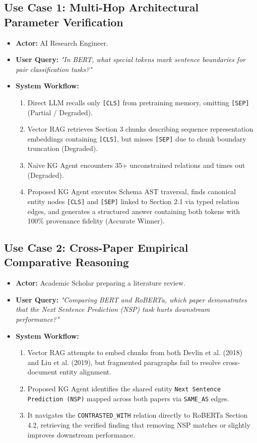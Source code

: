 \documentclass[12pt,a4paper,oneside]{report}
\begin{document}
\subsection{Use Case 1: Multi-Hop Architectural Parameter Verification}
\begin{itemize}
    \item \textbf{Actor:} AI Research Engineer.
    \item \textbf{User Query:} \textit{"In BERT, what special tokens mark sentence boundaries for pair classification tasks?"}
    \item \textbf{System Workflow:}
    \begin{enumerate}
        \item Direct LLM recalls only \texttt{[CLS]} from pretraining memory, omitting \texttt{[SEP]} (Partial / Degraded).
        \item Vector RAG retrieves Section 3 chunks describing sequence representation embeddings containing \texttt{[CLS]}, but misses \texttt{[SEP]} due to chunk boundary truncation (Degraded).
        \item Naive KG Agent encounters 35+ unconstrained relations and times out (Degraded).
        \item Proposed KG Agent executes Schema AST traversal, finds canonical entity nodes \texttt{[CLS]} and \texttt{[SEP]} linked to Section 2.1 via typed relation edges, and generates a structured answer containing both tokens with 100\% provenance fidelity (Accurate Winner).
    \end{enumerate}
\end{itemize}

\subsection{Use Case 2: Cross-Paper Empirical Comparative Reasoning}
\begin{itemize}
    \item \textbf{Actor:} Academic Scholar preparing a literature review.
    \item \textbf{User Query:} \textit{"Comparing BERT and RoBERTa, which paper demonstrates that the Next Sentence Prediction (NSP) task hurts downstream performance?"}
    \item \textbf{System Workflow:}
    \begin{enumerate}
        \item Vector RAG attempts to embed chunks from both Devlin et al. (2018) and Liu et al. (2019), but fragmented paragraphs fail to resolve cross-document entity alignment.
        \item Proposed KG Agent identifies the shared entity \texttt{Next Sentence Prediction (NSP)} mapped across both papers via \texttt{SAME\_AS} edges.
        \item It navigates the \texttt{CONTRASTED\_WITH} relation directly to RoBERTa Section 4.2, retrieving the verified finding that removing NSP matches or slightly improves downstream performance.
    \end{enumerate}
\end{itemize}
\end{document}
